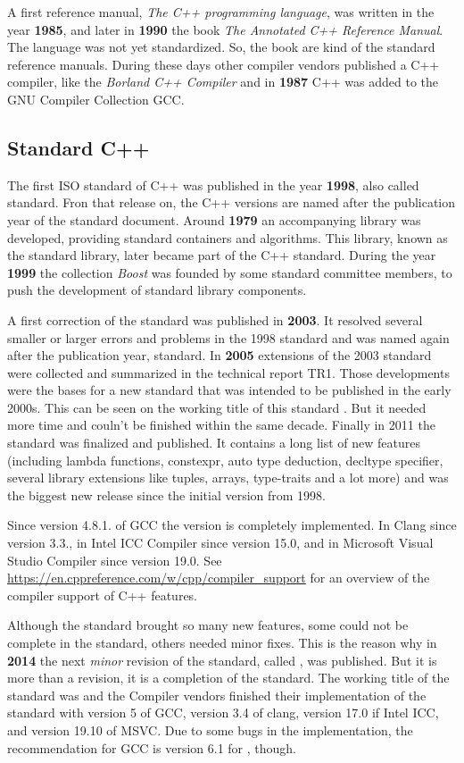 A first reference manual, \textit{The C++ programming language}, was written in the year \textbf{1985}, and later in \textbf{1990} the book
\textit{The Annotated C++ Reference Manual}. The language was not yet standardized. So, the book are kind of the standard reference manuals.
During these days other compiler vendors published a C++ compiler, like  the \textit{Borland C++ Compiler} and in \textbf{1987} C++ was added
to the GNU Compiler Collection GCC.

\subsection{Standard C++}
The first ISO standard of C++ was published in the year \textbf{1998}, also called  standard. Fron that release on, the C++ versions are
named after the publication year of the standard document. Around \textbf{1979} an accompanying library was developed, providing standard
containers and algorithms. This library, known as the standard library, later became part of the C++ standard. During the year \textbf{1999}
the collection \emph{Boost} was founded by some standard committee members, to push the development of standard library components.

A first correction of the  standard was published in \textbf{2003}. It resolved several smaller or larger errors and problems in the
1998 standard and was named again after the publication year,  standard. In \textbf{2005} extensions of the 2003 standard were collected
and summarized in the technical report TR1. Those developments were the bases for a new standard that was intended to be published in the
early 2000s. This can be seen on the working title of this standard . But it needed more time and couln't be finished within the same
decade. Finally in 2011 the standard  was finalized and published. It contains a long list of new features (including lambda functions,
constexpr, auto type deduction, decltype specifier, several library extensions like tuples, arrays, type-traits and a lot more) and was the
biggest new release since the initial version from 1998.

Since version 4.8.1. of GCC the  version is completely implemented. In Clang since version 3.3., in Intel ICC Compiler since version 15.0,
and in Microsoft Visual Studio Compiler since version 19.0. See \url{https://en.cppreference.com/w/cpp/compiler_support} for an overview of
the compiler support of C++ features.

Although the  standard brought so many new features, some could not be complete in the standard, others needed minor fixes. This is the reason
why in \textbf{2014} the next \emph{minor} revision of the standard, called , was published. But it is more than a revision, it is a completion
of the  standard. The working title of the standard was  and the Compiler vendors finished their implementation of the standard
with version 5 of GCC, version 3.4 of clang, version 17.0 if Intel ICC, and version 19.10 of MSVC. Due to some bugs in the implementation,
the recommendation for GCC is version 6.1 for , though.

